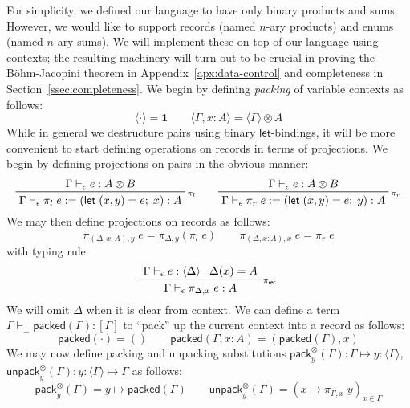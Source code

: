 \documentclass[acmsmall,screen,review]{acmart}
\newcommand{\mb}[1]{\ensuremath{\mathbf{#1}}}
\newcommand{\ms}[1]{\ensuremath{\mathsf{#1}}}
\newcommand{\letexpr}[3]{\ensuremath{\ms{let}\;#1 = #2;\;#3}}
\newcommand{\bhyp}[2]{#1 : #2}
\newcommand{\rle}[1]{{\scriptsize\textsf{#1}}}
\newcommand{\hasty}[4]{#1 \vdash_{#2} #3: {#4}}
\newcommand{\issubst}[3]{#1: #2 \mapsto #3}
\newcommand{\pckd}[1]{\langle #1 \rangle}
\begin{document}
For simplicity, we defined our language to have only binary products and sums. However, we would
like to support records (named $n$-ary products) and enums (named $n$-ary sums). We will implement
these on top of our language using contexts; the resulting machinery will turn out to be crucial in
proving the B\"ohm-Jacopini theorem in Appendix~\ref{apx:data-control} and completeness in
Section~\ref{ssec:completeness}. We begin by defining \emph{packing} of variable contexts as
follows:
\begin{equation}
  \pckd{\cdot} = \mb{1} \qquad \pckd{\Gamma, \bhyp{x}{A}} = \pckd{\Gamma} \otimes A
\end{equation}
While in general we destructure pairs using binary \ms{let}-bindings, it will be more convenient
to start defining operations on records in terms of projections. We begin by defining projections
on pairs in the obvious manner:
\begin{equation}
  \prftree[r]{\rle{$\pi_l$}}
    {\hasty{\Gamma}{\epsilon}{e}{A \otimes B}}
    {\hasty{\Gamma}{\epsilon}{\pi_l\;e := (\letexpr{(x, y)}{e}{x})}{A}}
  \qquad
  \prftree[r]{\rle{$\pi_r$}}
    {\hasty{\Gamma}{\epsilon}{e}{A \otimes B}}
    {\hasty{\Gamma}{\epsilon}{\pi_r\;e := (\letexpr{(x, y)}{e}{y})}{A}}
\end{equation}
We may then define projections on records as follows:
\begin{equation}
  \pi_{(\Delta, \bhyp{x}{A}), y}\;e = \pi_{\Delta, y}(\pi_l\;e) \qquad
  \pi_{(\Delta, \bhyp{x}{A}), x}\;e = \pi_r\;e
\end{equation}
with typing rule
\begin{equation}
  \prftree[r]{\rle{$\pi_{\ms{rec}}$}}
    {\hasty{\Gamma}{\epsilon}{e}{\pckd{\Delta}}}
    {\Delta(x) = A}
    {\hasty{\Gamma}{\epsilon}{\pi_{\Delta, x}\;e}{A}}
\end{equation}
We will omit $\Delta$ when it is clear from context. We can define a term
$\hasty{\Gamma}{\bot}{\ms{packed}(\Gamma)}{[\Gamma]}$ to ``pack'' up the current context
into a record as follows:
\begin{equation}
  \ms{packed}(\cdot) = () \qquad
  \ms{packed}(\Gamma, \bhyp{x}{A}) = (\ms{packed}(\Gamma), x)
\end{equation}
We may now define packing and unpacking substitutions
$\issubst{\ms{pack}_y^\otimes(\Gamma)}{\Gamma}{\bhyp{y}{\pckd{\Gamma}}}$,
$\issubst{\ms{unpack}_y^\otimes(\Gamma)}{\bhyp{y}{\pckd{\Gamma}}}{\Gamma}$ as follows:
\begin{equation}
  \ms{pack}_y^\otimes(\Gamma) = y \mapsto \ms{packed}(\Gamma) \qquad
  \ms{unpack}_y^\otimes(\Gamma) = (x \mapsto \pi_{\Gamma, x}\;y)_{x \in \Gamma}
\end{equation}
\end{document}
